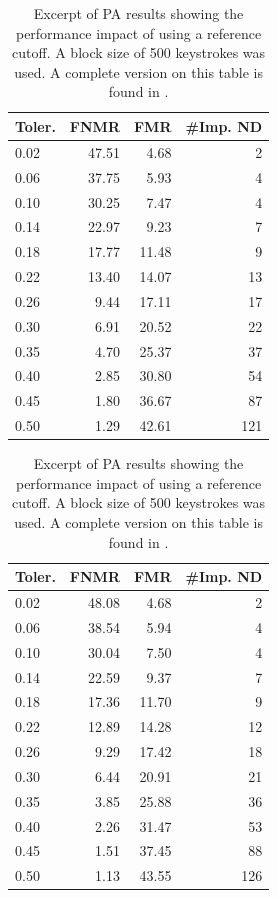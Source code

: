 \begin{table}[h]
\centering
\begin{subtable}[h]{0.45\textwidth}
\begin{tabular}{lrrr}
\hline
Toler. & FNMR & FMR & \#Imp. ND  \\ \hline
0.02 & 47.51 & 4.68  & 2   \\
0.06 & 37.75 & 5.93  & 4   \\
0.10  & 30.25 & 7.47  & 4   \\
0.14 & 22.97 & 9.23  & 7   \\
0.18 & 17.77 & 11.48 & 9   \\
0.22 & 13.40 & 14.07 & 13  \\
0.26 & 9.44  & 17.11 & 17  \\
0.30 & 6.91  & 20.52 & 22  \\
0.35 & 4.70  & 25.37 & 37  \\
0.40 & 2.85  & 30.80 & 54  \\
0.45 & 1.80  & 36.67 & 87  \\
0.50 & 1.29  & 42.61 & 121
 \end{tabular}
 \caption{Without reference cutoff.}
 \label{tab:PA-without-cutoff}
\end{subtable}
\hfill
\begin{subtable}[h]{0.45\textwidth}
\centering
\begin{tabular}{lrrr}
\hline
Toler. & FNMR  & FMR & \#Imp. ND \\ \hline
0.02 & 48.08 & 4.68  & 2   \\
0.06 & 38.54 & 5.94  & 4   \\
0.10 & 30.04 & 7.50  & 4   \\
0.14 & 22.59 & 9.37  & 7   \\
0.18 & 17.36 & 11.70 & 9   \\
0.22 & 12.89 & 14.28 & 12  \\
0.26 & 9.29  & 17.42 & 18  \\
0.30 & 6.44  & 20.91 & 21  \\
0.35 & 3.85  & 25.88 & 36  \\
0.40 & 2.26  & 31.47 & 53  \\
0.45 & 1.51  & 37.45 & 88  \\
0.50 & 1.13  & 43.55 & 126
\end{tabular}
\caption{With reference cutoff.}
\label{tab:PA-with-cutoff}
\end{subtable}
\caption{Excerpt of PA results showing the performance impact of using a reference cutoff. A block size of 500 keystrokes was used. A complete version on this table is found in .}
\label{tab:PA-cutoff}
\end{table}

